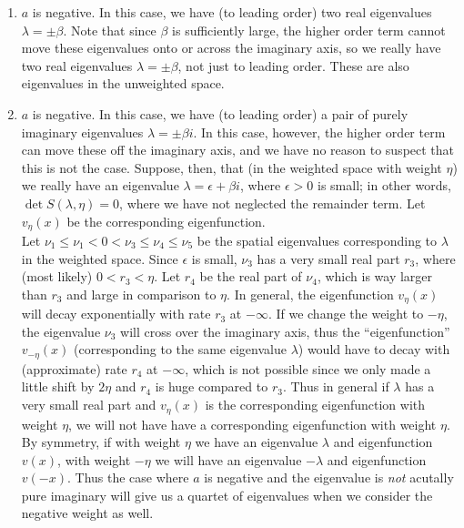 \documentclass[12pt]{article}
\begin{document}
\begin{enumerate}
	\item $a$ is negative. In this case, we have (to leading order) two real eigenvalues $\lambda = \pm \beta$. Note that since $\beta$ is sufficiently large, the higher order term cannot move these eigenvalues onto or across the imaginary axis, so we really have two real eigenvalues $\lambda = \pm \beta$, not just to leading order. These are also eigenvalues in the unweighted space.

	\item $a$ is negative. In this case, we have (to leading order) a pair of purely imaginary eigenvalues $\lambda = \pm \beta i$. In this case, however, the higher order term can move these off the imaginary axis, and we have no reason to suspect that this is not the case. Suppose, then, that (in the weighted space with weight $\eta$) we really have an eigenvalue $\lambda = \epsilon + \beta i$, where $\epsilon > 0$ is small; in other words, $\det S(\lambda, \eta) = 0$, where we have not neglected the remainder term. Let $v_\eta(x)$ be the corresponding eigenfunction. \\

	Let $\nu_1 \leq \nu_1 < 0 < \nu_3 \leq \nu_4 \leq \nu_5$ be the spatial eigenvalues corresponding to $\lambda$ in the weighted space. Since $\epsilon$ is small, $\nu_3$ has a very small real part $r_3$, where (most likely) $0 < r_3 < \eta$. Let $r_4$ be the real part of $\nu_4$, which is way larger than $r_3$ and large in comparison to $\eta$. In general, the eigenfunction $v_\eta(x)$ will decay exponentially with rate $r_3$ at $-\infty$. If we change the weight to $-\eta$, the eigenvalue $\nu_3$ will cross over the imaginary axis, thus the ``eigenfunction'' $v_{-\eta}(x)$ (corresponding to the same eigenvalue $\lambda$) would have to decay with (approximate) rate $r_4$ at $-\infty$, which is not possible since we only made a little shift by $2 \eta$ and $r_4$ is huge compared to $r_3$. Thus in general if $\lambda$ has a very small real part and $v_\eta(x)$ is the corresponding eigenfunction with weight $\eta$, we will not have have a corresponding eigenfunction with weight $\eta$.\\

	By symmetry, if with weight $\eta$ we have an eigenvalue $\lambda$ and eigenfunction $v(x)$, with weight $-\eta$ we will have an eigenvalue $-\lambda$ and eigenfunction $v(-x)$. Thus the case where $a$ is negative and the eigenvalue is \emph{not} acutally pure imaginary will give us a quartet of eigenvalues when we consider the negative weight as well.

 \end{enumerate}
\end{document}
